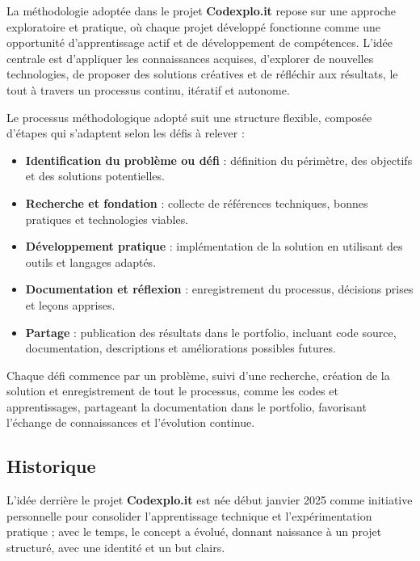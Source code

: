 \documentclass[10pt, a4paper, oneside]{article}
\begin{document}
La méthodologie adoptée dans le projet \textbf{Codexplo.it} repose sur une approche exploratoire et pratique, où chaque projet développé fonctionne comme une opportunité d’apprentissage actif et de développement de compétences. L’idée centrale est d’appliquer les connaissances acquises, d’explorer de nouvelles technologies, de proposer des solutions créatives et de réfléchir aux résultats, le tout à travers un processus continu, itératif et autonome.

Le processus méthodologique adopté suit une structure flexible, composée d’étapes qui s’adaptent selon les défis à relever :

\begin{itemize}
  \item \textbf{Identification du problème ou défi} : définition du périmètre, des objectifs et des solutions potentielles.
  \item \textbf{Recherche et fondation} : collecte de références techniques, bonnes pratiques et technologies viables.
  \item \textbf{Développement pratique} : implémentation de la solution en utilisant des outils et langages adaptés.
  \item \textbf{Documentation et réflexion} : enregistrement du processus, décisions prises et leçons apprises.
  \item \textbf{Partage} : publication des résultats dans le portfolio, incluant code source, documentation, descriptions et améliorations possibles futures.
\end{itemize}

Chaque défi commence par un problème, suivi d’une recherche, création de la solution et enregistrement de tout le processus, comme les codes et apprentissages, partageant la documentation dans le portfolio, favorisant l’échange de connaissances et l’évolution continue.

\subsection{Historique}

L’idée derrière le projet \textbf{Codexplo.it} est née début janvier 2025 comme initiative personnelle pour consolider l’apprentissage technique et l’expérimentation pratique ; avec le temps, le concept a évolué, donnant naissance à un projet structuré, avec une identité et un but clairs.
\end{document}
